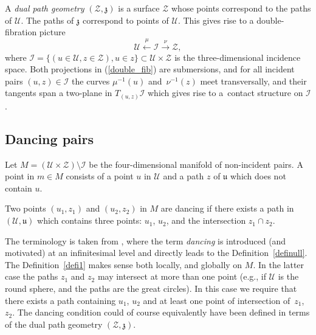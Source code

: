 \documentclass[pdftex]{sigma}%
\numberwithin{equation}{section}
\newcommand{\Z}{\mathbb{Z}}
\def\be{\begin{equation}}
\def\u{\mathfrak{u}}
\def\z{\mathfrak{z}}
\def\I{\mathcal{I}}
\def\ee{\end{equation}}
\renewcommand{\Z}{\mathcal{Z}}
\newcommand{\U}{\mathcal{U}}
\begin{document}
 A {\em dual path geometry} $(\Z, \z)$ is a surface $\Z$ whose points correspond to the paths of $\U$. The paths of $\z$ correspond to points of $\U$. This gives rise to a double-fibration picture \cite{bryant, cartan}
\be\label{double_fib}
\U\stackrel{\mu}\longleftarrow
{\mathcal I}\stackrel{\nu}\longrightarrow {\Z},
\ee
where $\I=\{(u\in \U, z\in \Z), u\in z\}\subset
\U\times \Z$ is the three-dimensional incidence space. Both projections in (\ref{double_fib}) are submersions, and for
all incident pairs $(u, z)\in \I$ the curves $\mu^{-1}(u)$ and~$\nu^{-1}(z)$
meet transversally, and their
tangents span a two-plane in $T_{(u,z)}\I$ which gives rise to a~contact structure on $\I$.

\subsection{Dancing pairs}
Let $M=(\U\times \Z)\setminus\I$ be the four-dimensional manifold of non-incident pairs.
A point in $m\in M$ consists of a point $u$ in $\U$ and a path $z$ of $\u$ which does not contain $u$.
\begin{Definition}
\label{defi1}
Two points $(u_1, z_1)$ and $(u_2, z_2)$ in $M$ are dancing if there exists a path in $(\U, {\u})$ which contains
 three points: $u_1$, $u_2$, and the intersection $z_1\cap z_2$.
\end{Definition}
 The terminology is taken from \cite{bor},
where the term {\em dancing} is introduced (and motivated) at an infinitesimal level and directly leads to
the Definition~\ref{definull}. The Definition~\ref{defi1} makes sense both locally, and globally on $M$.
In the latter case the paths $z_1$ and $z_2$ may intersect at more than one point
(e.g., if $\U$ is the round sphere, and the paths are the great circles). In this case we require that there exists a path containing
$u_1$, $u_2$ and at least one point of intersection of~$z_1$,~$z_2$. The dancing condition could of course equivalently have been defined in terms of the dual path geometry $(\Z, \z)$.
\end{document}
